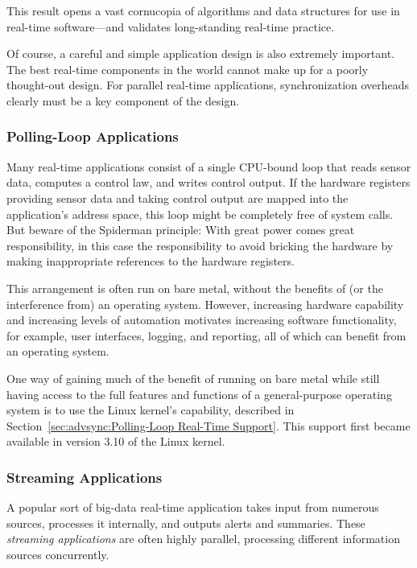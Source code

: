 This result opens a vast cornucopia of algorithms and data structures
for use in real-time software---and validates long-standing real-time practice.

Of course, a careful and simple application design is also extremely
important.
The best real-time components in the world cannot make up for a
poorly thought-out design.
For parallel real-time applications, synchronization overheads clearly
must be a key component of the design.

\subsubsection{Polling-Loop Applications}
\label{sec:advsync:Polling-Loop Applications}

Many real-time applications consist of a single CPU-bound loop that
reads sensor data, computes a control law, and writes control output.
If the hardware registers providing sensor data and taking control
output are mapped into the application's address space, this loop
might be completely free of system calls.
But beware of the Spiderman principle: With great power comes great
responsibility, in this case the responsibility to avoid bricking the
hardware by making inappropriate references to the hardware registers.

This arrangement is often run on bare metal, without the benefits of
(or the interference from) an operating system.
However, increasing hardware capability and increasing levels of
automation motivates increasing software functionality, for example,
user interfaces, logging, and reporting, all of which can benefit from
an operating system.

One way of gaining much of the benefit of running on bare metal while
still having access to the full features and functions of a
general-purpose operating system is to use the Linux kernel's
 capability, described in
Section~\ref{sec:advsync:Polling-Loop Real-Time Support}.
This support first became available in version 3.10 of the Linux kernel.

\subsubsection{Streaming Applications}
\label{sec:advsync:Streaming Applications}

A popular sort of big-data real-time application takes input from numerous
sources, processes it internally, and outputs alerts and summaries.
These \emph{streaming applications} are often highly parallel, processing
different information sources concurrently.

